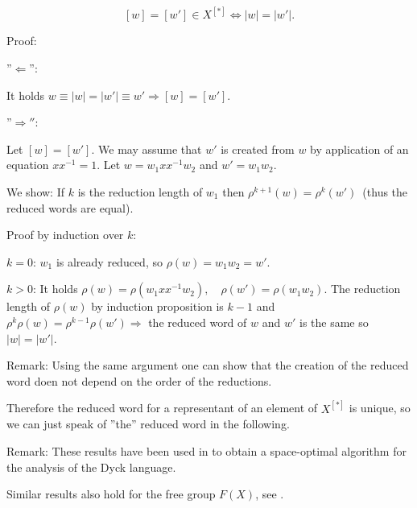 \begin{lemma}
\[ [w] = [w'] \in X^{[*]} \Leftrightarrow |w| = |w'|. \]
\end{lemma}

Proof: 

''$\Leftarrow$'':

It holds $w \equiv |w| = |w'| \equiv w' \Rightarrow [w] = [w']$.

''$\Rightarrow''$:

Let $[w] = [w']$. We may assume that $w'$ is created from $w$ by application of
an equation $x x^{-1} = 1$. Let $w = w_1 x x^{-1} w_2$ and $w' = w_1 w_2$.

We show: If $k$ is the reduction length of $w_1$ then $\rho^{k+1}(w) =
\rho^k(w')$\ (thus the reduced words are equal).

Proof by induction over $k$:

$k = 0$: $w_1$ is already reduced, so $\rho(w) = w_1 w_2 = w'$.

$k > 0$: It holds $\rho(w) = \rho(w_1 x x^{-1} w_2), \quad \rho(w') = \rho(w_1
w_2)$. The reduction length of $\rho(w)$ by induction proposition is $k-1$ and
$\rho^k \rho(w) = \rho^{k-1}\rho(w') \Rightarrow$ the reduced word of $w$ and
$w'$ is the same so $|w| = |w'|$.

Remark: Using the same argument one can show that the creation of the reduced
word doen not depend on the order of the reductions.

Therefore the reduced word for a representant of an element of $X^[*]$ is
unique, so we can just speak of ''the'' reduced word in the following.

Remark: These results have been used in \cite{HotzMesserschmidt} to obtain a
space-optimal algorithm for the analysis of the Dyck language.

Similar results also hold for the free group $F(X)$, see \cite{CrowellFox}.

